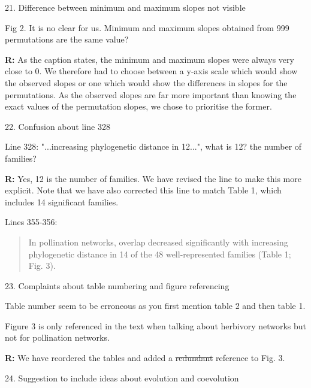 \documentclass[12pt]{letter}
\newenvironment{refquote}{\bigskip \begin{it}}{\end{it}\smallskip}
\providecommand{\DIFadd}[1]{{\protect\color{blue}\uwave{#1}}} %
\providecommand{\DIFdel}[1]{{\protect\color{red}\sout{#1}}}                      %
\providecommand{\DIFaddbegin}{} %
\providecommand{\DIFaddend}{} %
\providecommand{\DIFdelbegin}{} %
\providecommand{\DIFdelend}{} %
\newcommand{\DIFscaledelfig}{0.5}
\newlength{\DIFdelgraphicswidth} %
\newlength{\DIFdelgraphicsheight} %
\newcommand{\DIFaddincludegraphics}[2][]{{\color{blue}\fbox{\DIFOincludegraphics[#1]{#2}}}} %
\newcommand{\DIFdelincludegraphics}[2][]{%
\sbox{\DIFdelgraphicsbox}{\DIFOincludegraphics[#1]{#2}}%
\settoboxwidth{\DIFdelgraphicswidth}{\DIFdelgraphicsbox} %
\settoboxtotalheight{\DIFdelgraphicsheight}{\DIFdelgraphicsbox} %
\scalebox{\DIFscaledelfig}{%
\parbox[b]{\DIFdelgraphicswidth}{\usebox{\DIFdelgraphicsbox}\\[-\baselineskip] \rule{\DIFdelgraphicswidth}{0em}}\llap{\resizebox{\DIFdelgraphicswidth}{\DIFdelgraphicsheight}{%
\setlength{\unitlength}{\DIFdelgraphicswidth}%
\begin{picture}(1,1)%
\thicklines\linethickness{2pt} %
{\color[rgb]{1,0,0}\put(0,0){\framebox(1,1){}}}%
{\color[rgb]{1,0,0}\put(0,0){\line( 1,1){1}}}%
{\color[rgb]{1,0,0}\put(0,1){\line(1,-1){1}}}%
\end{picture}%
}\hspace*{3pt}}} %
} %
\DeclareRobustCommand{\DIFaddbegin}{\DIFOaddbegin \let\includegraphics\DIFaddincludegraphics} %
\DeclareRobustCommand{\DIFaddend}{\DIFOaddend \let\includegraphics\DIFOincludegraphics} %
\DeclareRobustCommand{\DIFdelbegin}{\DIFOdelbegin \let\includegraphics\DIFdelincludegraphics} %
\DeclareRobustCommand{\DIFdelend}{\DIFOaddend \let\includegraphics\DIFOincludegraphics} %
\begin{document}
	21. Difference between minimum and maximum slopes not visible 

		\begin{refquote}
			Fig 2. It is no clear for us. Minimum and maximum slopes obtained from 999 permutations are the same value?
		\end{refquote}


		\textbf{R:} As the caption states, the minimum and maximum slopes were always very close to 0. We therefore had to choose between a y-axis scale which would show the observed slopes or one which would show the differences in slopes for the permutations. As the observed slopes are far more important than knowing the exact values of the permutation slopes, we chose to prioritise the former.


	22. Confusion about line 328

		\begin{refquote}
			Line  328: "...increasing phylogenetic distance in 12...", what is 12? the number of families?
		\end{refquote}

		\textbf{R:} Yes, 12 is the number of families. We have revised the line to make this more explicit. Note that we have also corrected this line to match Table 1, which includes 14 significant families.


		Lines 355-356: 


		\begin{quotation}

		In pollination networks, overlap decreased significantly with increasing phylogenetic distance in 14 of the 48 well-represented families (Table 1; Fig. 3).

		\end{quotation}


	23. Complaints about table numbering and figure referencing

		\begin{refquote}
			Table number seem to be erroneous as you first mention table 2 and then table 1.

			\smallskip

			Figure 3 is only referenced in the text when talking about herbivory networks but not for pollination networks.
		\end{refquote}

		\textbf{R:} We have reordered the tables and added a \DIFdelbegin \DIFdel{redundant }\DIFdelend \DIFaddbegin \DIFadd{second }\DIFaddend reference to Fig. 3.


	24. Suggestion to include ideas about evolution and coevolution 
\end{document}
